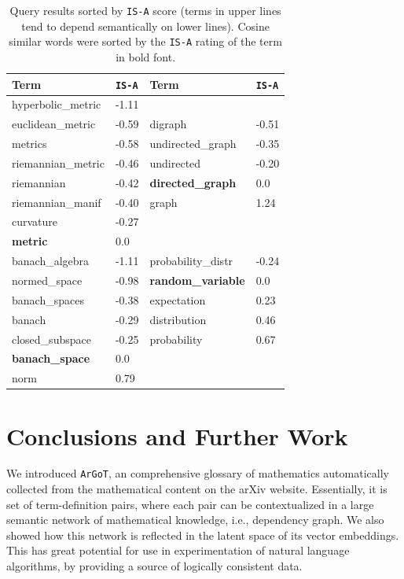 \documentclass[submission,copyright,creativecommons]{eptcs}
\newcommand{\argot}{\texttt{ArGoT}\xspace}
\newcommand{\isa}{\texttt{IS-A}\xspace}
\begin{document}
\begin{table}
    \small
\centering
\begin{tabular}{ll|ll}
    \hline \textbf{Term} &  \isa &  
    \textbf{Term} &  \isa \\ \hline
    hyperbolic\_metric & -1.11 &  &\\
euclidean\_metric & -0.59  & digraph & -0.51 \\
metrics & -0.58 & undirected\_graph & -0.35 \\
riemannian\_metric & -0.46  &  undirected & -0.20 \\
riemannian & -0.42  & \textbf{directed\_graph} &  0.0\\
riemannian\_manif & -0.40 & graph & 1.24 \\
curvature & -0.27  & & \\
\textbf{metric} & 0.0 & & \\
\hline
banach\_algebra & -1.11  & probability\_distr & -0.24 \\
normed\_space & -0.98 & \textbf{random\_variable} & 0.0 \\
banach\_spaces & -0.38 & expectation & 0.23 \\
banach & -0.29  & distribution & 0.46 \\
closed\_subspace & -0.25 & probability & 0.67 \\
\textbf{banach\_space} & 0.0 & & \\
norm & 0.79 & & \\

\end{tabular}
\caption{\label{tab:hypernyny} 
   Query results sorted by \isa score (terms in upper lines tend to depend semantically on lower lines).  Cosine similar words were sorted by the
    \isa rating of the term in bold font. }
\end{table}


\section{Conclusions and Further Work}
We introduced \argot, an comprehensive glossary of mathematics
automatically collected from the mathematical content on the arXiv website. 
Essentially, it is set of term-definition pairs, where 
each pair can be contextualized in a large semantic network of
mathematical knowledge, i.e., dependency graph. We also showed how this 
network is reflected in the latent space of its vector embeddings. This
has great potential for use in experimentation of natural language
algorithms, by providing a source of logically consistent data. 
\end{document}
